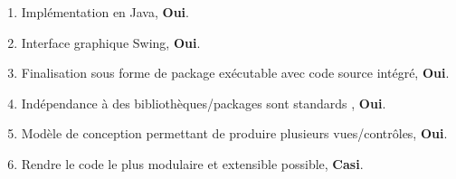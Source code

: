 \documentclass{article}           %
\begin{document}
\begin{enumerate}
	\item Implémentation en Java, \textbf{Oui}.	
	\item Interface graphique Swing, \textbf{Oui}.
	\item Finalisation sous forme de package exécutable avec code source intégré, \textbf{Oui}.
	\item Indépendance à des bibliothèques/packages sont standards , \textbf{Oui}.
	\item Modèle de conception permettant de produire plusieurs vues/contrôles, \textbf{Oui}.
	\item Rendre le code le plus modulaire et extensible possible, \textbf{Casi}.
\end{enumerate}
 											 
\end{document}

